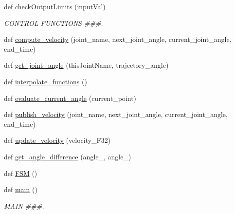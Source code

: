 \begin{DoxyCompactItemize}
\item 
def \mbox{\hyperlink{namespacepedal__simulation__interpolation__lennard_a19e0927e352a6dc42f4e6d5354085257}{check\+Output\+Limits}} (input\+Val)
\begin{DoxyCompactList}\small\item\em C\+O\+N\+T\+R\+OL F\+U\+N\+C\+T\+I\+O\+NS \#\#\#. \end{DoxyCompactList}\item 
def \mbox{\hyperlink{namespacepedal__simulation__interpolation__lennard_ad86b44a97e31f2c448d832f4f74c06ca}{compute\+\_\+velocity}} (joint\+\_\+name, next\+\_\+joint\+\_\+angle, current\+\_\+joint\+\_\+angle, end\+\_\+time)
\item 
def \mbox{\hyperlink{namespacepedal__simulation__interpolation__lennard_a8e17b4244dcce7052398fe9a4a377a06}{get\+\_\+joint\+\_\+angle}} (this\+Joint\+Name, trajectory\+\_\+angle)
\item 
def \mbox{\hyperlink{namespacepedal__simulation__interpolation__lennard_ae9c9788cdc89b6581cd2a587ef85282c}{interpolate\+\_\+functions}} ()
\item 
def \mbox{\hyperlink{namespacepedal__simulation__interpolation__lennard_ac38ee65ab4e2c40fcf65de76cb7e72f9}{evaluate\+\_\+current\+\_\+angle}} (current\+\_\+point)
\item 
def \mbox{\hyperlink{namespacepedal__simulation__interpolation__lennard_a2c1393a71ebf4ef7da408eb959e9a8ad}{publish\+\_\+velocity}} (joint\+\_\+name, next\+\_\+joint\+\_\+angle, current\+\_\+joint\+\_\+angle, end\+\_\+time)
\item 
def \mbox{\hyperlink{namespacepedal__simulation__interpolation__lennard_a815caeaf6a6a52507b939cbaad0e676b}{update\+\_\+velocity}} (velocity\+\_\+\+F32)
\item 
def \mbox{\hyperlink{namespacepedal__simulation__interpolation__lennard_ae98aebfd88ca1ccae8edacb3b860c21a}{get\+\_\+angle\+\_\+difference}} (angle\+\_, angle\+\_)
\item 
def \mbox{\hyperlink{namespacepedal__simulation__interpolation__lennard_a17be109d0d18c5a2729893c296f4d6ef}{F\+SM}} ()
\item 
def \mbox{\hyperlink{namespacepedal__simulation__interpolation__lennard_a29ca8543b538f5084be3465159234d94}{main}} ()
\begin{DoxyCompactList}\small\item\em M\+A\+IN \#\#\#. \end{DoxyCompactList}\end{DoxyCompactItemize}
